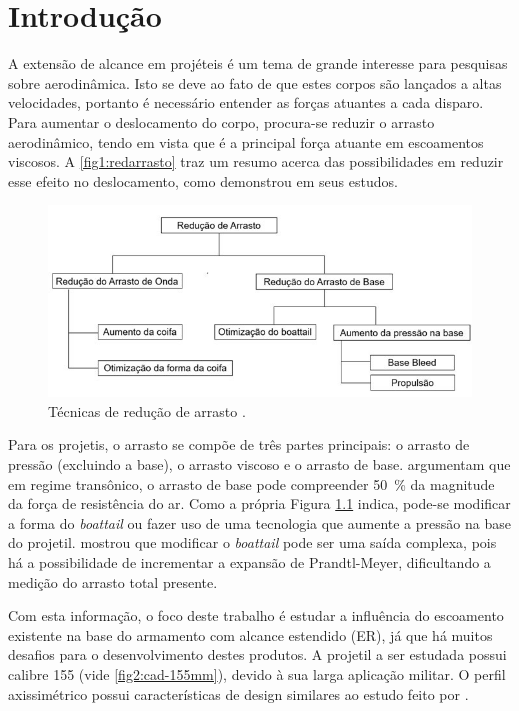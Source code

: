 \chapter{Introdução}
\graphicspath{{chapter-01/img-cap01/}}

A extensão de alcance em projéteis é um tema de grande interesse para pesquisas sobre aerodinâmica. Isto se deve ao fato de que estes corpos são lançados a altas velocidades, portanto é necessário entender as forças atuantes a cada disparo. Para aumentar o deslocamento do corpo, procura-se reduzir o arrasto aerodinâmico, tendo em vista que é a principal força atuante em escoamentos viscosos. A \autoref{fig1:redarrasto} traz um resumo acerca das possibilidades em reduzir esse efeito no deslocamento, como \cite{Dali2018a} demonstrou em seus estudos.

\begin{figure}[!ht]
	\centering
	\includegraphics[width=1.0\textwidth]{foto01-reducao-arrasto.png}
	\caption[Técnicas de redução de arrasto, traduzido e adaptado.]{Técnicas de redução de arrasto \cite{Dali2018a}.}
	\label{fig1:redarrasto}
\end{figure}

Para os projetis, o arrasto se compõe de três partes principais: o arrasto de pressão (excluindo a base), o arrasto viscoso e o arrasto de base. \cite{Sahu1985} argumentam que em regime transônico, o arrasto de base pode compreender \qty{50}{\percent} da magnitude da força de resistência do ar. Como a própria Figura \ref{fig1:redarrasto} indica, pode-se modificar a forma do \textit{boattail} ou fazer uso de uma tecnologia que aumente a pressão na base do projetil. \cite{Sedney1966} mostrou que modificar o \textit{boattail} pode ser uma saída complexa, pois há a possibilidade de incrementar a expansão de Prandtl-Meyer, dificultando a medição do arrasto total presente.

Com esta informação, o foco deste trabalho é estudar a influência do escoamento existente na base do armamento com alcance estendido (ER), já que há muitos desafios para o desenvolvimento destes produtos. A projetil a ser estudada possui calibre \qty{155}{\millimetre} (vide \autoref{fig2:cad-155mm}), devido à sua larga aplicação militar. O perfil axissimétrico possui características de design similares ao estudo feito por \cite{Mahmoud2009}.

